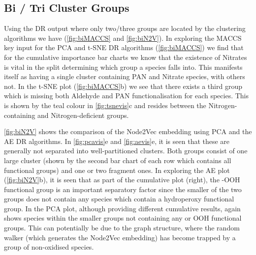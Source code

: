 \subsection{Bi / Tri Cluster Groups } \label{sec:bigroups}

Using the DR output where only two/three groups are located by the clustering algorithms we have (\autoref{fig:biMACCS} and \autoref{fig:biN2V}). In exploring the MACCS key input for the PCA and t-SNE DR algorithms (\autoref{fig:biMACCS}) we find that for the cumulative importance bar charts we know that the existence of Nitrates is vital in the split determining which group a species falls into. This manifests itself as having a single cluster containing PAN and Nitrate species, with others not. In the t-SNE plot (\autoref{fig:biMACCS}b) we see that there exists a third group which is missing both Aldehyde and PAN functionalisation for each species. This is shown by the teal colour in \autoref{fig:tsnevis}c and resides between the Nitrogen-containing and Nitrogen-deficient groups.

\autoref{fig:biN2V} shows the comparison of the Node2Vec embedding using PCA and the AE DR algorithms. In \autoref{fig:pcavis}e and \autoref{fig:aevis}e, it is seen that these are generally not separated into well-partitioned clusters. Both groups consist of one large cluster (shown by the second bar chart of each row which contains all functional groups) and one or two fragment ones. In exploring the AE plot (\autoref{fig:biN2V}b), it is seen that as part of the cumulative plot (right), the -OOH functional group is an important separatory factor since the smaller of the two groups does not contain any species which contain a hydroperoxy functional group. In the PCA plot, although providing different cumulative results, again shows species within the smaller groups not containing any  or OOH functional groups. This can potentially be due to the graph structure, where the random walker (which generates the Node2Vec embedding) has become trapped by a group of non-oxidised species.


